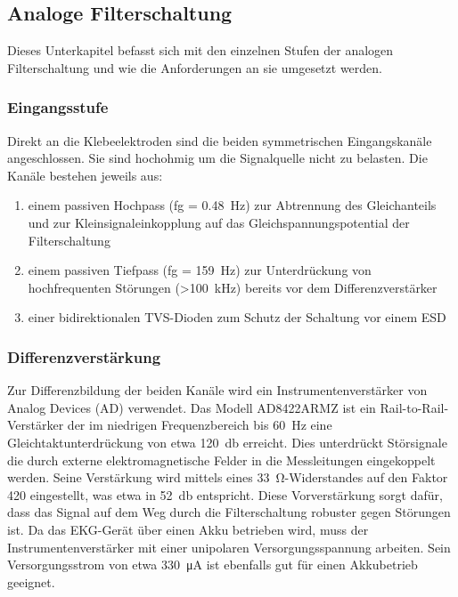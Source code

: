 
\subsection{Analoge Filterschaltung}

Dieses Unterkapitel befasst sich mit den einzelnen Stufen der analogen Filterschaltung und wie die Anforderungen an sie umgesetzt werden.

\subsubsection{Eingangsstufe}

Direkt an die Klebeelektroden sind die beiden symmetrischen Eingangskanäle angeschlossen. Sie sind hochohmig um die Signalquelle nicht zu belasten. Die Kanäle bestehen jeweils aus:

\begin{enumerate}

\item einem passiven Hochpass (fg = \SI{0,48}{\hertz}) zur Abtrennung des Gleichanteils und zur Kleinsignaleinkopplung auf das Gleichspannungspotential der Filterschaltung

\item einem passiven Tiefpass (fg = \SI{159}{\hertz}) zur Unterdrückung von hochfrequenten Störungen (>\SI{100}{\kilo\hertz}) bereits vor dem Differenzverstärker

\item einer bidirektionalen TVS-Dioden zum Schutz der Schaltung vor einem ESD

\end{enumerate}

\subsubsection{Differenzverstärkung}

Zur Differenzbildung der beiden Kanäle wird ein Instrumentenverstärker von Analog Devices (AD) verwendet. Das Modell AD8422ARMZ ist ein Rail-to-Rail-Verstärker der im niedrigen Frequenzbereich bis \SI{60}{\hertz} eine Gleichtaktunterdrückung von etwa \SI{120}{\decibel} erreicht. Dies unterdrückt Störsignale die durch externe elektromagnetische Felder in die Messleitungen eingekoppelt werden. Seine Verstärkung wird mittels eines \SI{33}{\ohm}-Widerstandes auf den Faktor 420 eingestellt, was etwa in \SI{52}{\decibel} entspricht. Diese Vorverstärkung sorgt dafür, dass das Signal auf dem Weg durch die Filterschaltung robuster gegen Störungen ist. Da das EKG-Gerät über einen Akku betrieben wird, muss der Instrumentenverstärker mit einer unipolaren Versorgungsspannung arbeiten. Sein Versorgungsstrom von etwa \SI{330}{\micro\ampere} ist ebenfalls gut für einen Akkubetrieb geeignet. \cite{Datenblatt_InAmp}

